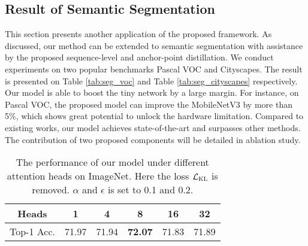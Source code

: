 \documentclass[10pt,twocolumn,letterpaper]{article}
\begin{document}
\subsection{Result of Semantic Segmentation}
This section presents another application of the proposed framework. As discussed, our method can be extended to semantic segmentation with assistance by the proposed sequence-level and anchor-point distillation. We conduct experiments on two popular benchmarks Pascal VOC and Cityscapes. The result is presented on Table \ref{tab:seg_voc} and Table \ref{tab:seg_cityscapes} respectively. Our model is able to boost the tiny network by a large margin. For instance, on Pascal VOC, the proposed model can improve the MobileNetV3 by more than 5\%, which shows great potential to unlock the hardware limitation. Compared to existing works, our model achieves state-of-the-art and surpasses other methods. The contribution of two proposed components will be detailed in ablation study.  

\begin{table}[h]
    \caption{The performance of our model under different $\epsilon$ on ImageNet. Here the loss $\mathcal{L}_{\rm{KL}}$ is removed and $\alpha$ is set to 0.1.}
    \centering
    \label{tab:imagenet_gamma}
\end{table}

\begin{table}[h]
    \caption{The performance of our model under different attention heads on ImageNet. Here the loss $\mathcal{L}_{\rm{KL}}$ is removed. $\alpha$ and $\epsilon$ is set to 0.1 and 0.2.}
    \centering
    \begin{tabular}{c|ccccc}
        \toprule
        Heads  &1 &4 &8 &16 &32 \\
        \midrule
        Top-1 Acc.&71.97 &71.94 &\textbf{72.07} &71.83 &71.89 \\
        \bottomrule
    \end{tabular}
    \label{tab:imagenet_heads}
\end{table}
\end{document}
